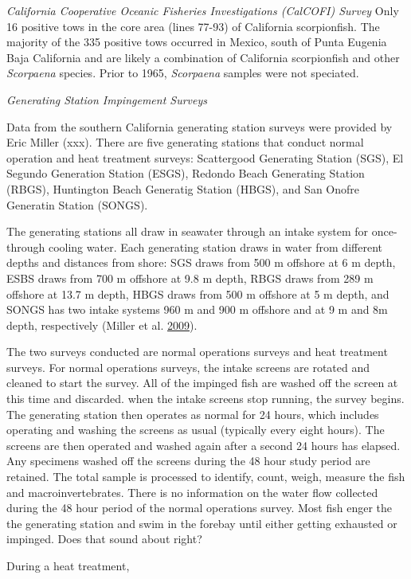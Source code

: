 \documentclass[12pt,]{article}
\begin{document}
\emph{California Cooperative Oceanic Fisheries Investigations (CalCOFI)
Survey} Only 16 positive tows in the core area (lines 77-93) of
California scorpionfish. The majority of the 335 positive tows occurred
in Mexico, south of Punta Eugenia Baja California and are likely a
combination of California scorpionfish and other \emph{Scorpaena}
species. Prior to 1965, \emph{Scorpaena} samples were not speciated.

\emph{Generating Station Impingement Surveys}

Data from the southern California generating station surveys were
provided by Eric Miller (xxx). There are five generating stations that
conduct normal operation and heat treatment surveys: Scattergood
Generating Station (SGS), El Segundo Generation Station (ESGS), Redondo
Beach Generating Station (RBGS), Huntington Beach Generatig Station
(HBGS), and San Onofre Generatin Station (SONGS).

The generating stations all draw in seawater through an intake system
for once-through cooling water. Each generating station draws in water
from different depths and distances from shore: SGS draws from 500 m
offshore at 6 m depth, ESBS draws from 700 m offshore at 9.8 m depth,
RBGS draws from 289 m offshore at 13.7 m depth, HBGS draws from 500 m
offshore at 5 m depth, and SONGS has two intake systems 960 m and 900 m
offshore and at 9 m and 8m depth, respectively (Miller et al.
\protect\hyperlink{ref-Miller2009}{2009}).

The two surveys conducted are normal operations surveys and heat
treatment surveys. For normal operations surveys, the intake screens are
rotated and cleaned to start the survey. All of the impinged fish are
washed off the screen at this time and discarded. when the intake
screens stop running, the survey begins. The generating station then
operates as normal for 24 hours, which includes operating and washing
the screens as usual (typically every eight hours). The screens are then
operated and washed again after a second 24 hours has elapsed. Any
specimens washed off the screens during the 48 hour study period are
retained. The total sample is processed to identify, count, weigh,
measure the fish and macroinvertebrates. There is no information on the
water flow collected during the 48 hour period of the normal operations
survey. Most fish enger the the generating station and swim in the
forebay until either getting exhausted or impinged. Does that sound
about right?

During a heat treatment,
\end{document}
